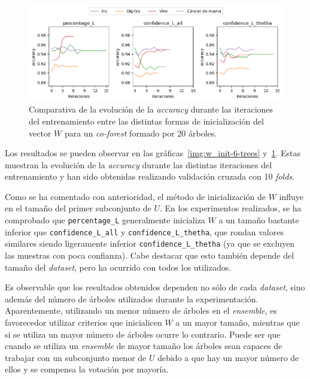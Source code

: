 \begin{figure}[h]
	\caption[\textit{Co-Forest}: resultados (inicialización $W$ con 20 árboles)]{Comparativa de la evolución de la \textit{accuracy} durante las iteraciones del entrenamiento entre las distintas formas de inicialización del vector $W$ para un \textit{co-forest} formado por 20 árboles.}
	\label{img:w_init-20-trees}
	\centering
	\includegraphics[width=\textwidth]{../img/memoria/5_coforest_w-init_rd5_n20}
\end{figure}

Los resultados se pueden observar en las gráficas~\ref{img:w_init-6-trees} y~\ref{img:w_init-20-trees}. Estas muestran la evolución de la \textit{accuracy} durante las distintas iteraciones del entrenamiento y han sido obtenidas realizando validación cruzada con 10 \textit{folds}.

Como se ha comentado con anterioridad, el método de inicialización de $W$ influye en el tamaño del primer subconjunto de $U$. En los experimentos realizados, se ha comprobado que \texttt{percentage\_L} generalmente inicializa $W$ a un tamaño bastante inferior que \texttt{confidence\_L\_all} y \texttt{confidence\_L\_thetha}, que rondan valores similares siendo ligeramente inferior \texttt{confidence\_L\_thetha} (ya que se excluyen las muestras con poca confianza). Cabe destacar que esto también depende del tamaño del \textit{dataset}, pero ha ocurrido con todos los utilizados.

Es observable que los resultados obtenidos dependen no sólo de cada \textit{dataset}, sino además del número de árboles utilizados durante la experimentación. Aparentemente, utilizando un menor número de árboles en el \textit{ensemble}, es favorecedor utilizar criterios que inicialicen $W$ a un mayor tamaño, mientras que si se utiliza un mayor número de árboles ocurre lo contrario. Puede ser que cuando se utiliza un \textit{ensemble} de mayor tamaño los árboles sean capaces de trabajar con un subconjunto menor de $U$ debido a que hay un mayor número de ellos y se compensa la votación por mayoría.


